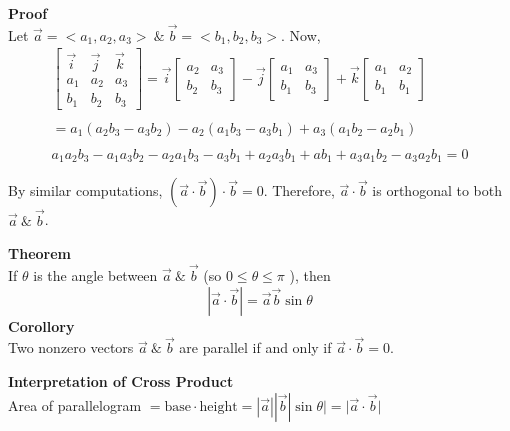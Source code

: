 \documentclass{article}
\begin{document}
  \textbf{Proof}\\
  Let $ \vec{ a } = < a_1, a_2, a_3> ~ \&~ \vec{ b } = < b_1, b_2, b_3>    $. Now,
  \[
    \begin{gathered}
    \begin{bmatrix}
      \vec{ i } & \vec{ j } & \vec{ k }\\
      a_1 &a_2 &a_3\\
      b_1 &b_2 &b_3
    \end{bmatrix}
    = \vec{ i } \begin{bmatrix}
      a_2 &a_3\\
      b_2 &b_3
    \end{bmatrix} - 
    \vec{ j } \begin{bmatrix}
      a_1 &a_3\\
      b_1 &b_3
    \end{bmatrix} + 
    \vec{ k } \begin{bmatrix}
      a_1 &a_2\\
      b_1 &b_1
    \end{bmatrix}\\
    ~\\
     = a_{1}  (a_2b_3-a_3b_2) - a_{2}  (a_1b_3 - a_3b_1) + a_{3} (a_1b_2 - a_2b_{1})\\
     ~\\
     a_{1}a_{2}b_{3}-a_{1}a_{3}b_{2}-a_{2}a_{1}b_{3}-a_{3}b_{1}+a_{2}a_{3}b_{1}+ab_{1}+a_{3}a_{1}b_{2}-a_{3}a_{2}b_{1}=0\\
     ~\\
    \end{gathered}
  \]
    By similar computations, $(\vec{a}\cdot \vec{b}) \cdot \vec{b}=0$. Therefore, $ \vec{a} \cdot \vec{b} $ is orthogonal to both $ \vec{a} ~\&~ \vec{b} $.

    \textbf{Theorem}\\
    If $ \theta $ is the angle between $ \vec{a} ~\&~ \vec{b}$ (so $ 0\le \theta \le \pi $ ), then  
    \[
     | \vec{a} \cdot  \vec{b}| = \vec{a} \vec{b} \sin{\theta}
    \]
    \textbf{Corollory}\\
    Two nonzero vectors $ \vec{a} ~\&~ \vec{b}$ are parallel if and only if $ \vec{a} \cdot \vec{b} = 0 .$
    
    \textbf{Interpretation of Cross Product}\\
    Area of parallelogram $ = \text{base} \cdot  \text{height} = | \vec{a} | |\vec{b}| \sin{\theta}|=| \vec{a} \cdot  \vec{b} |$ 
\end{document}
